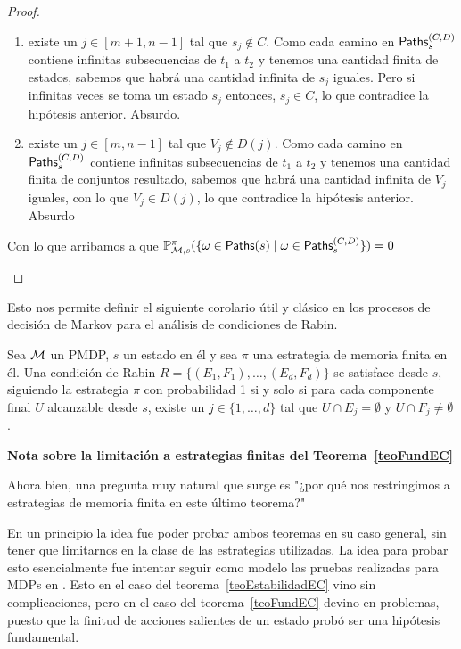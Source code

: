\begin{proof}
\begin{itemize}
		      \begin{enumerate}
			      \item existe un $j \in [m+1, n-1]$ tal que $s_j \notin C$. Como cada camino en
			            $\textsf{Paths}_s^{(C,D)}$ contiene infinitas subsecuencias de $t_1$ a $t_2$ y tenemos
			            una cantidad finita de estados, sabemos que habrá una cantidad infinita de
			            $s_j$ iguales. Pero si infinitas veces se toma un estado $s_j$ entonces, $s_j
				            \in C$, lo que contradice la hipótesis anterior. Absurdo.

			      \item existe un $j \in [m, n-1]$ tal que $V_j \notin D(j)$. Como cada camino en
			            $\textsf{Paths}_s^{(C,D)}$ contiene infinitas subsecuencias de $t_1$ a $t_2$ y tenemos
			            una cantidad finita de conjuntos resultado, sabemos que habrá una cantidad
			            infinita de $V_j$ iguales, con lo que $V_j \in D(j)$, lo que contradice la
			            hipótesis anterior. Absurdo
		      \end{enumerate}
		      Con lo que arribamos a que $\mathbb{P}^\pi_{\mathcal{M}, s}(\{ \omega \in \textsf{Paths}(s) \mid \omega \in \textsf{Paths}_s^{(C,D)}\}) = 0  $
	\end{itemize}

\end{proof}

Esto nos permite definir el siguiente corolario útil y clásico en los procesos
de decisión de Markov para el análisis de condiciones de Rabin.

\begin{corollary}
	Sea $\mathcal{M}$ un PMDP, $s$ un estado en él y sea $\pi$ una estrategia de memoria finita en él. Una condición de Rabin $R = \{ (E_1, F_1), \dots, (E_d, F_d)\}$ se satisface desde $s$, siguiendo la estrategia $\pi$ con probabilidad 1 si y solo si para cada componente final $U$ alcanzable desde $s$, existe un $j \in \{ 1, \dots, d\}$ tal que $U \cap E_j = \emptyset$ y $U \cap F_j \neq \emptyset$.
\end{corollary}

\textbf{Nota sobre la limitación a estrategias finitas del Teorema~\ref{teoFundEC}}

Ahora bien, una pregunta muy natural que surge es "¿por qué nos restringimos a
estrategias de memoria finita en este último teorema?"

En un principio la idea fue poder probar ambos teoremas en su caso general, sin
tener que limitarnos en la clase de las estrategias utilizadas. La idea para
probar esto esencialmente fue intentar seguir como modelo las pruebas
realizadas para MDPs en \cite{AlfaroThesis,BaierKatoen}. Esto en el caso del
teorema~\ref{teoEstabilidadEC} vino sin complicaciones, pero en el caso del
teorema~\ref{teoFundEC} devino en problemas, puesto que la finitud de acciones
salientes de un estado probó ser una hipótesis fundamental.

